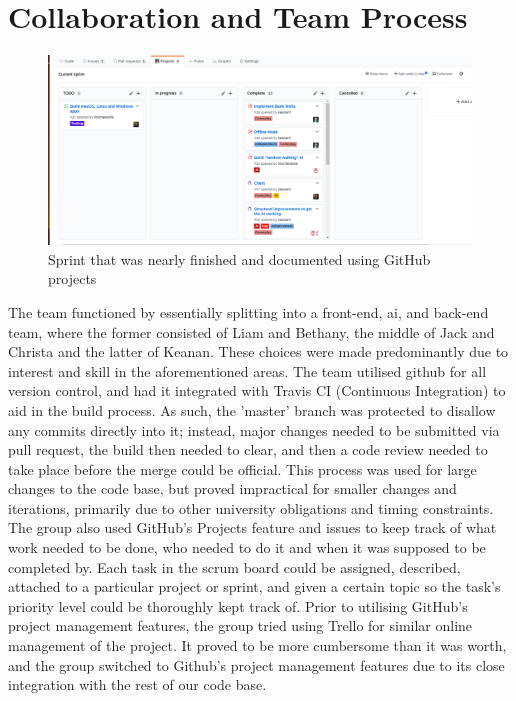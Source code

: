 \documentclass[a4paper,doc,draftfirst]{apa6}
\begin{document}
\section{Collaboration and Team Process}
\begin{figure}[hbtp]
\includegraphics[width=\textwidth]{githubProjects}
\caption{Sprint that was nearly finished and documented using GitHub projects}
\end{figure}
The team functioned by essentially splitting into a front-end, ai, and back-end team, where the former consisted of Liam and Bethany, the middle of Jack and Christa and the latter of Keanan. These choices were made predominantly due to interest and skill in the aforementioned areas. The team utilised github for all version control, and had it integrated with Travis CI (Continuous Integration) to aid in the build process. As such, the 'master' branch was protected to disallow any commits directly into it; instead, major changes needed to be submitted via pull request, the build then needed to clear, and then a code review needed to take place before the merge could be official. This process was used for large changes to the code base, but proved impractical for smaller changes and iterations, primarily due to other university obligations and timing constraints. The group also used GitHub's Projects feature and issues to keep track of what work needed to be done, who needed to do it and when it was supposed to be completed by. Each task in the scrum board could be assigned, described, attached to a particular project or sprint, and given a certain topic so the task's priority level could be thoroughly kept track of. Prior to utilising GitHub's project management features, the group tried using Trello for similar online management of the project. It proved to be more cumbersome than it was worth, and the group switched to Github's project management features due to its close integration with the rest of our code base.
\end{document}
